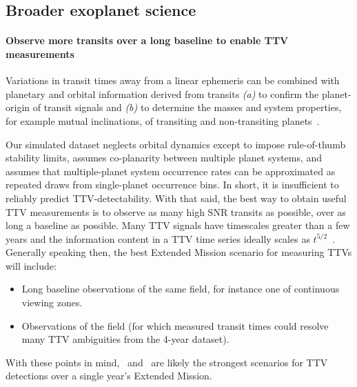 \subsection{Broader exoplanet science}
\label{sec:broader_exoplanet_science}

\paragraph{Observe more transits over a long baseline to enable TTV measurements}
Variations in transit times away from a linear ephemeris can be combined with planetary and orbital information derived from transits \textit{(a)} to confirm the planet-origin of transit signals and \textit{(b)} to determine the masses and system properties, for example mutual inclinations, of transiting and non-transiting planets~\citep{agol_detecting_2005}.

Our simulated dataset neglects orbital dynamics except to impose rule-of-thumb stability limits, assumes co-planarity between multiple planet systems, and assumes that multiple-planet system occurrence rates can be approximated as repeated draws from single-planet occurrence bins.
In short, it is insufficient to reliably predict TTV-detectability.
With that said, the best way to obtain useful TTV measurements is to observe as many high SNR transits as possible, over as long a baseline as possible.
Many TTV signals have timescales greater than a few years
and the information content in a TTV time series ideally scales as $t^{5/2}$~\citep{fabrycky_whitepaper_2013}.
Generally speaking then, the best Extended Mission scenario for measuring TTVs will include:
\begin{itemize}
	\item Long baseline observations of the same field, for instance one of \tesss continuous viewing zones.
	\item Observations of the \kepler field (for which measured transit times could resolve many TTV ambiguities from the 4-year dataset).
\end{itemize}
With these points in mind, \nhemi\ and \npole\ are likely the strongest scenarios for TTV detections over a single year's Extended Mission.

\begin{comment}
\textbf{Focus on compact multiple-planet systems}
\citet{muirhead_kepler-445_2015} estimate that $21^{+7}_{-5}\%$ of mid-M dwarfs host multiple planets with periods of less than 10 days.
\end{comment}



